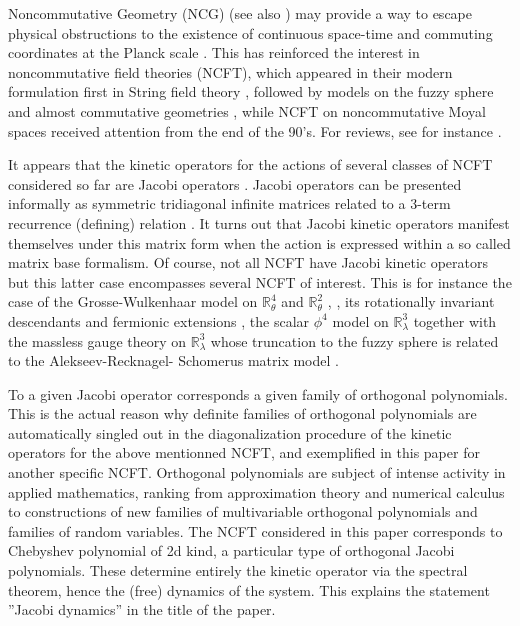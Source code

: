 \documentclass[a4paper]{jpconf}
\numberwithin{equation}{section}
\theoremstyle{nonumberplain}
\begin{document}
Noncommutative Geometry (NCG) \cite{Connes1} (see also \cite{GBVF}) may provide a way to escape physical obstructions to the existence of continuous space-time and commuting coordinates at the Planck scale \cite{Doplich1}. This has reinforced the interest in noncommutative field theories (NCFT), which appeared in their modern formulation first in String field theory \cite{witt1}, followed by models on the fuzzy sphere and almost commutative geometries \cite{mdv1}, \cite{gm90} while NCFT on noncommutative Moyal spaces received attention from the end of the 90's. For reviews, see for instance \cite{dnsw-rev}.\par 

It appears that the kinetic operators for the actions of several classes of NCFT considered so far are Jacobi operators \cite{akhiez:1965}. Jacobi operators can be presented informally as symmetric tridiagonal infinite matrices related to a 3-term recurrence (defining) relation \cite{akhiez:1965}. It turns out that Jacobi kinetic operators manifest themselves under this matrix form when the action is expressed within a so called matrix base formalism. Of course, not all NCFT have Jacobi kinetic operators but this latter case encompasses several NCFT of interest. This is for instance the case of the Grosse-Wulkenhaar model on $\mathbb{R}^4_\theta$ and $\mathbb{R}^2_\theta$ \cite{gw1}, \cite{gw2}, its rotationally invariant descendants \cite{gwm-4} and fermionic extensions \cite{VT}, the scalar $\phi^4$ model on $\mathbb{R}^3_\lambda$ \cite{vit-wal-12} together with the massless gauge theory on $\mathbb{R}^3_\lambda$ \cite{gvw13} whose truncation to the fuzzy sphere is related to the Alekseev-Recknagel-
Schomerus matrix model \cite{ARS}.\par 

To a given Jacobi operator corresponds a given family of orthogonal polynomials. This is the actual reason why definite families of orthogonal polynomials are automatically singled out in the diagonalization procedure of the kinetic operators for the above mentionned NCFT, and exemplified in this paper for another specific NCFT. Orthogonal polynomials are subject of intense activity in applied mathematics, ranking from approximation theory and numerical calculus to constructions of new families of multivariable orthogonal polynomials and families of random variables. The NCFT considered in this paper corresponds to Chebyshev polynomial of 2d kind, a particular type of orthogonal Jacobi polynomials. These determine entirely the kinetic operator via the spectral theorem, hence the (free) dynamics of the system. This explains the statement ''Jacobi dynamics'' in the title of the paper.\par 
\end{document}
